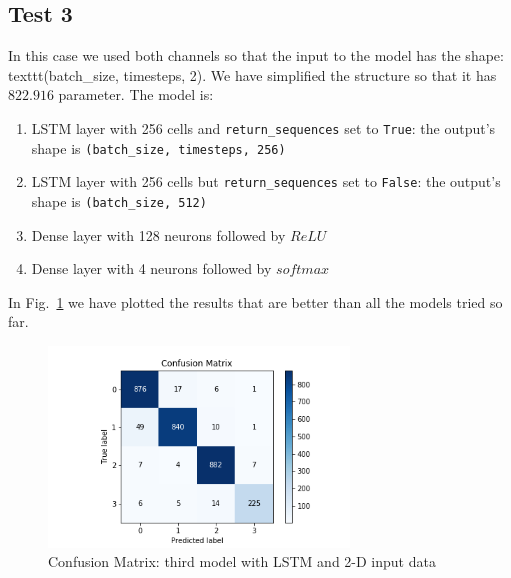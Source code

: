 \documentclass[LaM,binding=0.6cm]{sapthesis}
\begin{document}
\subsection{Test 3}
In this case we used both channels so that the input to the model has the shape: texttt{(batch\_size, timesteps, 2)}. We have simplified the structure so that it has $822.916$ parameter. The model is:
\begin{enumerate}
\item LSTM layer with 256 cells and \texttt{return\_sequences} set to \texttt{True}: the output's shape is \texttt{(batch\_size, timesteps, 256)} 
\item LSTM layer with 256 cells but \texttt{return\_sequences} set to \texttt{False}: the output's shape is \texttt{(batch\_size, 512)} 
\item Dense layer with 128 neurons followed by $ReLU$
\item Dense layer with 4 neurons followed by $softmax$
\end{enumerate}
In Fig.~\ref{fig:lstmt3} we have plotted the results that are better than all the models tried so far.
\begin{figure}  \centering
    \includegraphics[width=80mm,scale=0.7]{lstmt3}
    \caption{Confusion Matrix: third model with LSTM and 2-D input data}
    \label{fig:lstmt3}
\end{figure}
\end{document}
